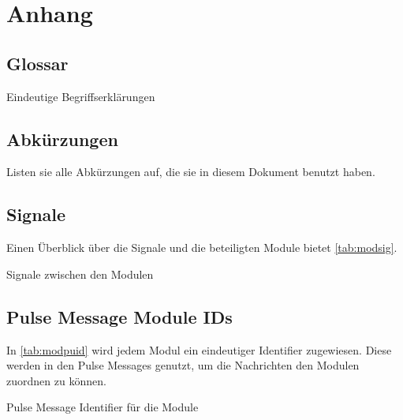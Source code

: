\chapter{Anhang}

\section{Glossar}

Eindeutige Begriffserklärungen

\section{Abkürzungen}

Listen sie alle Abkürzungen auf, die sie in diesem Dokument benutzt
haben.

\section{Signale}

Einen Überblick über die Signale und die beteiligten Module bietet
\autoref{tab:modsig}.

\begin{table}
	\centering
	\caption{Signale zwischen den Modulen}
	\label{tab:modsig}
\end{table}

\section{Pulse Message Module IDs}

In \autoref{tab:modpuid} wird jedem Modul ein eindeutiger Identifier
zugewiesen.
Diese werden in den Pulse Messages genutzt, um die Nachrichten den
Modulen zuordnen zu können.

\begin{table}
	\centering
	\caption{Pulse Message Identifier für die Module}
	\label{tab:modpuid}
\end{table}

